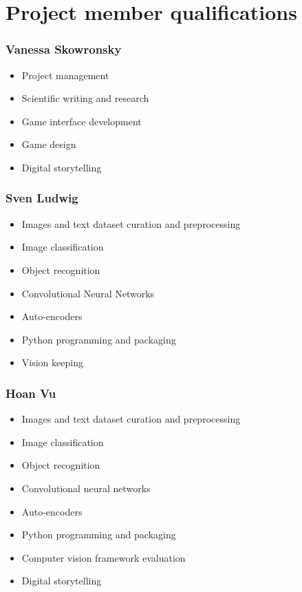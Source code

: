 \section{Project member qualifications}
\subsubsection*{Vanessa Skowronsky}
\begin{itemize}
    \item Project management
    \item Scientific writing and research
    \item Game interface development
    \item Game design
    \item Digital storytelling
  \end{itemize}  
\subsubsection*{Sven Ludwig}
\begin{itemize}
    \item Images and text dataset curation and preprocessing
    \item Image classification
    \item Object recognition
    \item Convolutional Neural Networks
    \item Auto-encoders
    \item Python programming and packaging
    \item Vision keeping
  \end{itemize}  
\subsubsection*{Hoan Vu}
\begin{itemize}
    \item Images and text dataset curation and preprocessing
    \item Image classification
    \item Object recognition
    \item Convolutional neural networks
    \item Auto-encoders
    \item Python programming and packaging
    \item Computer vision framework evaluation
    \item Digital storytelling
  \end{itemize}  
